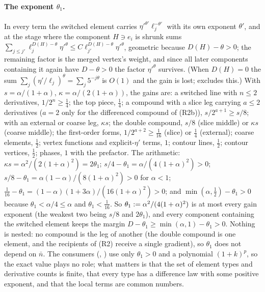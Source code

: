 \paragraph{The exponent $\theta_1$.}
In every term the switched element carries $\eta'^{\theta'}\ell_{j}^{-\theta'}$ with its own exponent $\theta'$, and  at the stage where the component $H\ni e_i$ is shrunk sums $\sum_{j\le j'}\ell_j^{D(H)-\theta}\eta'^\theta\le C\ell_{j'}^{D(H)-\theta}\eta'^\theta$, geometric because $D(H)-\theta>0$; the remaining factor is the merged vertex's weight, and since all later components containing it again have $D-\theta>0$ the factor $\eta'^\theta$ survives. (When $D(H)=0$ the sum $\sum_j(\eta'/\ell_j)^\theta=\sum_j5^{-j\theta}$ is $O(1)$ and the gain is lost;  excludes this.) With $s=\alpha/(1+\alpha)$, $\kappa=\alpha/(2(1+\alpha))$, the gains are: a switched line with $n\le2$ derivatives, $1/2^n\ge\frac14$; the top piece, $\frac14$; a compound with a slice leg carrying $a\le2$ derivatives ($a=2$ only for the differenced compound of (R2b)), $s/2^{a+1}\ge s/8$; with an external or coarse leg, $\kappa s$; the double compound, $s/8$ (slice middle) or $\kappa s$ (coarse middle); the first-order forms, $1/2^{a+2}\ge\frac1{16}$ (slice) or $\frac14$ (external); coarse elements, $\frac12$; vertex functions and explicit-$\eta'$ terms, $1$; contour lines, $\frac12$; contour vertices, $\frac12$; phases, $1$ with the prefactor. The arithmetic: $\kappa s=\alpha^2/(2(1+\alpha)^2)=2\theta_1$; $s/4-\theta_1=\alpha/(4(1+\alpha)^2)>0$; $s/8-\theta_1=\alpha(1-\alpha)/(8(1+\alpha)^2)>0$ for $\alpha<1$; $\frac1{16}-\theta_1=(1-\alpha)(1+3\alpha)/(16(1+\alpha)^2)>0$; and $\min(\alpha,\frac12)-\theta_1>0$ because $\theta_1<\alpha/4\le\alpha$ and $\theta_1<\frac1{16}$. So $\theta_1:=\alpha^2/(4(1+\alpha)^2)$ is at most every gain exponent (the weakest two being $s/8$ and $2\theta_1$), and every component containing the switched element keeps the margin $D-\theta_1\ge\min(\alpha,1)-\theta_1>0$. Nothing is nested: no compound is the leg of another (the double compound is one element, and the recipients of (R2) receive a single gradient), so $\theta_1$ does not depend on $\bar n$. The consumers (, ) use only $\theta_1>0$ and a polynomial $(1+k)^p$, so the exact value plays no role; what matters is that the set of element types and derivative counts is finite, that every type has a difference law with some positive exponent, and that the local terms are common numbers.

